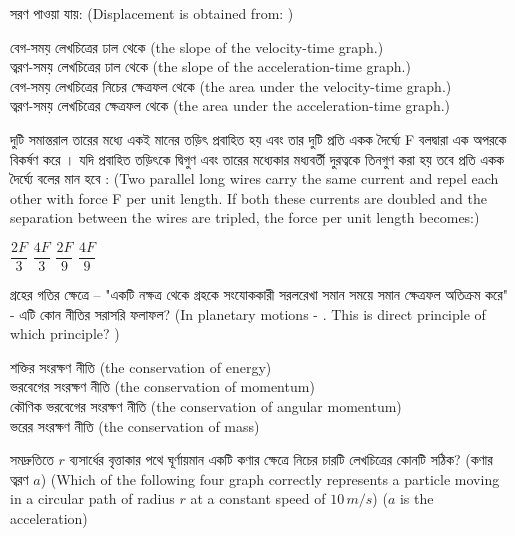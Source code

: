 \documentclass[addpoints]{exam}
\begin{document}
\begin{questions}
\question  সরণ পাওয়া যায়: (Displacement is obtained from: )

\begin{oneparchoices}
\choice বেগ-সময় লেখচিত্রের ঢাল থেকে (the slope of the velocity-time graph.)\\
\choice ত্বরণ-সময় লেখচিত্রের ঢাল থেকে (the slope of the acceleration-time graph.)\\
\choice বেগ-সময় লেখচিত্রের নিচের ক্ষেত্রফল থেকে (the area under the velocity-time graph.)\\
\choice ত্বরণ-সময় লেখচিত্রের ক্ষেত্রফল থেকে (the area under the acceleration-time graph.)

\end{oneparchoices}

\question   দুটি সমান্তরাল তারের মধ্যে একই মানের তড়িৎ প্রবাহিত হয় এবং তার দুটি প্রতি একক দৈর্ঘ্যে F বলদ্বারা এক অপরকে বিকর্ষণ করে । যদি প্রবাহিত তড়িৎকে দ্বিগুণ এবং তারের মধ্যেকার মধ্যবর্তী দুরত্বকে তিনগুণ করা হয় তবে প্রতি একক দৈর্ঘ্যে বলের মান হবে : (Two parallel long wires carry the same current and repel each other with force F per unit length. If both these currents are doubled and the separation between the wires are tripled, the force per unit length becomes:)

\begin{oneparchoices}
\choice $ \dfrac{2F}{3} $
\choice $ \dfrac{4F}{3} $
\choice $ \dfrac{2F}{9} $
\choice $ \dfrac{4F}{9} $

\end{oneparchoices}

\question  গ্রহের গতির ক্ষেত্রে – "একটি নক্ষত্র থেকে গ্রহকে সংযোককারী সরলরেখা সমান সময়ে সমান ক্ষেত্রফল অতিক্রম করে" - এটি কোন নীতির সরাসরি ফলাফল? (In planetary motions - . This is direct principle of which principle? )

\begin{oneparchoices}
\choice শক্তির সংরক্ষণ নীতি (the conservation of energy)\\
\choice ভরবেগের সংরক্ষণ নীতি (the conservation of momentum) \\
\choice কৌণিক ভরবেগের সংরক্ষণ নীতি (the conservation of angular momentum)\\
\choice ভরের সংরক্ষণ নীতি (the conservation of mass)
\end{oneparchoices}

\question সমদ্রুতিতে $ r $ ব্যসার্ধের বৃত্তাকার পথে ঘূর্ণায়মান একটি কণার ক্ষেত্রে নিচের চারটি লেখচিত্রের কোনটি সঠিক? (কণার ত্বরণ $ a $) (Which of the following four graph correctly represents a particle moving in a circular path of radius $ r $ at a constant speed of $ 10\,m/s $) ($ a $ is the acceleration)


\end{questions}
\end{document}
